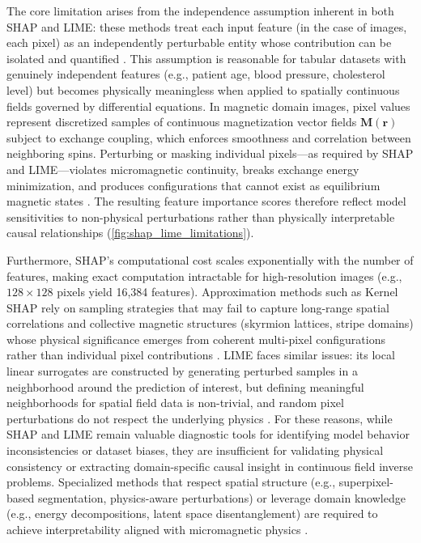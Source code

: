 \documentclass[letterpaper, 12, one column]{article}
\begin{document}
The core limitation arises from the independence assumption inherent in both SHAP and LIME: these methods treat each input feature (in the case of images, each pixel) as an independently perturbable entity whose contribution can be isolated and quantified \cite{Kumar2020Problems}. This assumption is reasonable for tabular datasets with genuinely independent features (e.g., patient age, blood pressure, cholesterol level) but becomes physically meaningless when applied to spatially continuous fields governed by differential equations. In magnetic domain images, pixel values represent discretized samples of continuous magnetization vector fields $\mathbf{M}(\mathbf{r})$ subject to exchange coupling, which enforces smoothness and correlation between neighboring spins. Perturbing or masking individual pixels---as required by SHAP and LIME---violates micromagnetic continuity, breaks exchange energy minimization, and produces configurations that cannot exist as equilibrium magnetic states \cite{Li2025Explainable}. The resulting feature importance scores therefore reflect model sensitivities to non-physical perturbations rather than physically interpretable causal relationships (\cref{fig:shap_lime_limitations}).

Furthermore, SHAP's computational cost scales exponentially with the number of features, making exact computation intractable for high-resolution images (e.g., $128 \times 128$ pixels yield 16,384 features). Approximation methods such as Kernel SHAP rely on sampling strategies that may fail to capture long-range spatial correlations and collective magnetic structures (skyrmion lattices, stripe domains) whose physical significance emerges from coherent multi-pixel configurations rather than individual pixel contributions \cite{Covert2021Explaining}. LIME faces similar issues: its local linear surrogates are constructed by generating perturbed samples in a neighborhood around the prediction of interest, but defining meaningful neighborhoods for spatial field data is non-trivial, and random pixel perturbations do not respect the underlying physics \cite{Raptis2024Pixels}. For these reasons, while SHAP and LIME remain valuable diagnostic tools for identifying model behavior inconsistencies or dataset biases, they are insufficient for validating physical consistency or extracting domain-specific causal insight in continuous field inverse problems. Specialized methods that respect spatial structure (e.g., superpixel-based segmentation, physics-aware perturbations) or leverage domain knowledge (e.g., energy decompositions, latent space disentanglement) are required to achieve interpretability aligned with micromagnetic physics \cite{Achtibat2023Attribution}.
\end{document}
